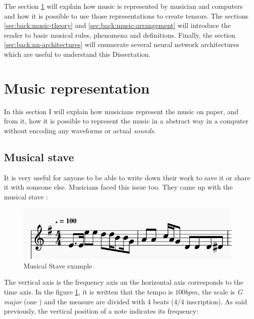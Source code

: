 \documentclass[12pt]{report}
\begin{document}
The section \ref{sec:back:musical-representation} will explain how music is represented by musician and computers and how it is possible to use those representations to create tensors.
The sections \ref{sec:back:music-theory} and \ref{sec:back:music-arrangement} will introduce the reader to basic musical rules, phenomena and definitions.
Finally, the section \ref{sec:back:nn-architectures} will enumerate several neural network architectures which are useful to understand this Dissertation.


\section{Music representation}
\label{sec:back:musical-representation}

In this section I will explain how musicians represent the music on paper, and from it, how it is possible to represent the music in a abstract way in a computer without encoding any waveforms or actual \textit{sounds}.

\subsection{Musical stave}

It is very useful for anyone to be able to write down their work to save it or share it with someone else. Musicians faced this issue too. They came up with the musical stave :

\begin{figure}[H]
    \centering
    \includegraphics[scale=0.75]{images/music/stave/musical_stave_example.jpg}
    \caption{Musical Stave example}
    \label{fig:musical_stave_example}
\end{figure}

The vertical axis is the frequency axis an the horizontal axis corresponds to the time axis.
In the figure \ref{fig:musical_stave_example}, it is written that the tempo is $100 bpm$, the scale is \textit{G major} (one \musSharp) and the measure are divided with 4 beats ($4/4$ inscription).
As said previously, the vertical position of a note indicates its frequency:
\end{document}
